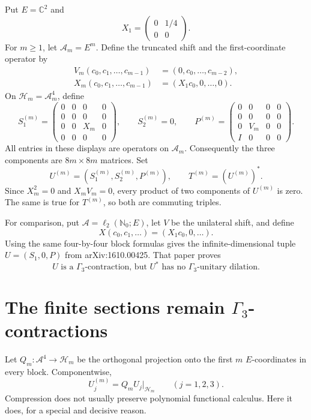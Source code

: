 \documentclass[11pt]{article}
\newcommand{\G}{\Gamma_3}
\newcommand{\cH}{\mathcal H}
\newcommand{\cA}{\mathcal A}
\begin{document}
Put $E=\mathbb C^2$ and
\[
 X_1=\begin{pmatrix}0&1/4\\0&0\end{pmatrix}.
\]
For $m\geq1$, let $\cA_m=E^m$.  Define the truncated shift and the
first-coordinate operator by
\begin{align*}
 V_m(c_0,c_1,\ldots,c_{m-1})
   &=(0,c_0,\ldots,c_{m-2}),\\
 X_m(c_0,c_1,\ldots,c_{m-1})
   &=(X_1c_0,0,\ldots,0).
\end{align*}
On $\cH_m=\cA_m^4$, define
\[
 S_1^{(m)}=
 \begin{pmatrix}
 0&0&0&0\\0&0&0&0\\0&0&X_m&0\\0&0&0&0
 \end{pmatrix},\qquad
 S_2^{(m)}=0,\qquad
 P^{(m)}=
 \begin{pmatrix}
 0&0&0&0\\0&0&0&0\\0&V_m&0&0\\I&0&0&0
 \end{pmatrix}.
\]
All entries in these displays are operators on $\cA_m$.  Consequently the
three components are $8m\times8m$ matrices.  Set
\[
 U^{(m)}=(S_1^{(m)},S_2^{(m)},P^{(m)}),\qquad
 T^{(m)}=(U^{(m)})^*.
\]
Since $X_m^2=0$ and $X_mV_m=0$, every product of two components of
$U^{(m)}$ is zero.  The same is true for $T^{(m)}$, so both are commuting
triples.

For comparison, put $\cA=\ell_2(\mathbb N_0;E)$, let $V$ be the unilateral
shift, and define
\[
 X(c_0,c_1,\ldots)=(X_1c_0,0,\ldots).
\]
Using the same four-by-four block formulas gives the infinite-dimensional
tuple $U=(S_1,0,P)$ from arXiv:1610.00425.  That paper proves
\begin{equation}\label{known-input}
 U\text{ is a $\G$-contraction, but }U^*\text{ has no $\G$-unitary
 dilation.}
\end{equation}

\section{The finite sections remain
\texorpdfstring{$\Gamma_3$}{Gamma-3}-contractions}

Let $Q_m:\cA^4\to\cH_m$ be the orthogonal projection onto the first $m$
$E$-coordinates in every block.  Componentwise,
\[
 U_j^{(m)}=Q_mU_j|_{\cH_m}\qquad(j=1,2,3).
\]
Compression does not usually preserve polynomial functional calculus.
Here it does, for a special and decisive reason.
\end{document}
